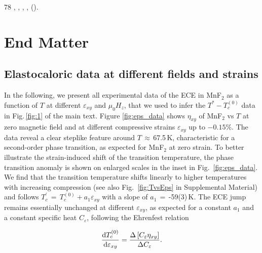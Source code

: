 \documentclass[
 reprint,










 amsmath,amssymb,
 aps,






]{revtex4-2}
\begin{document}
\begin{thebibliography}{78}
,
  , 
  ,
   \textbf{},
   ().

\end{thebibliography}











\newpage
\clearpage

\section*{End Matter}


\subsection{Elastocaloric data at different fields and strains}
\label{sec:parameters}

In the following, we present all experimental data of the ECE in MnF$_2$ as a function of $T$ at different $\varepsilon_{xy}$ and $\mu_0 H_z$, that we used to infer the $T^*-T_c^{(0)}$ data in Fig.\,\ref{fig:1} of the main text. Figure \ref{fig:eps_data} shows $\eta_{xy}$ of MnF$_2$ vs $T$ at zero magnetic field and at different compressive strains $\varepsilon_{xy}$ up to $-0.15\%$. The data reveal a clear steplike feature around $T\,\approx\,$67.5\,K, characteristic for a second-order phase transition, as expected for MnF$_2$ at zero strain. To better illustrate the strain-induced shift of the transition temperature, the phase transition anomaly is shown on enlarged scales in the inset in Fig.~\ref{fig:eps_data}. We find that the transition temperature shifts linearly to higher temperatures with increasing compression (see also Fig.~\ref{fig:TvsEps} in Supplemental Material) and follows $T^\prime_c\,=\,T_c^{(0)} + a_1 \varepsilon_{xy}$ with a slope of $a_1\,=\,$-59(3)\,K. The ECE jump remains essentially unchanged at different $\varepsilon_{xy}$, as expected for a constant $a_1$ and a constant specific heat $C_\varepsilon$, following the Ehrenfest relation


\begin{equation}
\frac{\textnormal{d}T_c^{(0)}}{\textnormal{d}\varepsilon_{xy}} = \frac{\Delta \left[C_\varepsilon \eta_{xy}\right]}{\Delta C_\varepsilon}.
\label{eq:Ehrenfest}
\end{equation}
\end{document}
